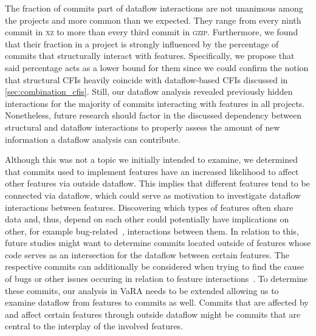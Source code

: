 The fraction of commits part of dataflow interactions are not unanimous among the projects and more common than we expected.
They range from every ninth commit in \textsc{xz} to more than every third commit in \textsc{gzip}.
Furthermore, we found that their fraction in a project is strongly influenced by the percentage of commits that structurally interact with features.
Specifically, we propose that said percentage acts as a lower bound for them since we could confirm the notion that structural CFIs heavily coincide with dataflow-based CFIs discussed in \autoref{sec:combination_cfis}.
Still, our dataflow analysis revealed previously hidden interactions for the majority of commits interacting with features in all projects.
Nonetheless, future research should factor in the discussed dependency between structural and dataflow interactions to properly assess the amount of new information a dataflow analysis can contribute. 

Although this was not a topic we initially intended to examine, we determined that commits used to implement features have an increased likelihood to affect other features via outside dataflow.
This implies that different features tend to be connected via dataflow, which could serve as motivation to investigate dataflow interactions between features.
Discovering which types of features often share data and, thus, depend on each other could potentially have implications on other, for example bug-related~\cite{nie2011survey}, interactions between them.
In relation to this, future studies might want to determine commits located outside of features whose code serves as an intersection for the dataflow between certain features.
The respective commits can additionally be considered when trying to find the cause of bugs or other issues occuring in relation to feature interactions~\cite{apel2014feature}.
To determine these commits, our analysis in VaRA needs to be extended allowing us to examine dataflow from features to commits as well.
Commits that are affected by and affect certain features through outside dataflow might be commits that are central to the interplay of the involved features. 

